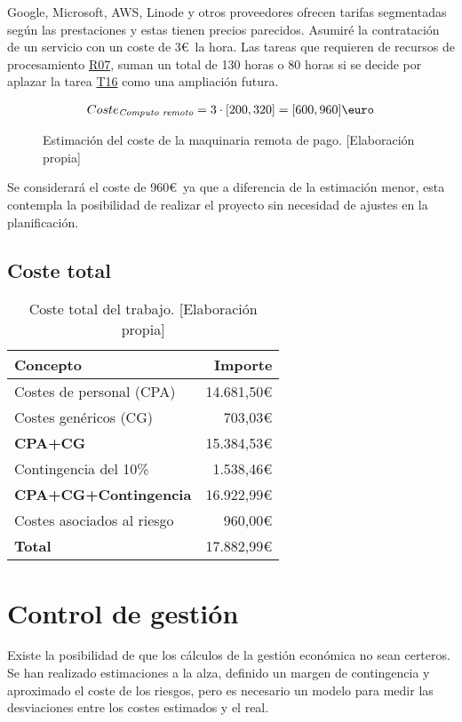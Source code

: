 Google, Microsoft, AWS, Linode y otros proveedores ofrecen tarifas segmentadas según
las prestaciones y estas tienen precios parecidos. Asumiré la contratación de un servicio con un coste de 3\euro\ la hora.
Las tareas que requieren de recursos de procesamiento \hyperref[R07]{R07}, suman un total de
130 horas o 80 horas si se decide por aplazar la tarea \hyperref[T16]{T16} como una ampliación futura.
\begin{figure}[H]
    \begin{align*}
        Coste_{\textit{Computo remoto}} = 3 \cdot [200, 320] = [600, 960]\text{\euro}
    \end{align*}
    \caption{Estimación del coste de la maquinaria remota de pago.  [Elaboración propia]}
\end{figure}
Se considerará el coste de 960\euro\ ya que a diferencia de la estimación menor, esta contempla la posibilidad de
realizar el proyecto sin necesidad de ajustes en la planificación.


\begin{table}[H]
    \subsection{Coste total}
    \begin{center}
        \begin{tabular}{ l r }
         Concepto & Importe \\
         \hline
         Costes de personal (CPA) & 14.681,50\euro \\
         Costes genéricos (CG) & 703,03\euro \\
         \textbf{CPA+CG} & 15.384,53\euro \\
         Contingencia del 10\% & 1.538,46\euro \\
         \textbf{CPA+CG+Contingencia} & 16.922,99\euro \\
         Costes asociados al riesgo & 960,00\euro \\ 
         \hline \hline
         \textbf{Total} & 17.882,99\euro
        \end{tabular}
        \caption{Coste total del trabajo. [Elaboración propia]}\label{totalcosttable}
    \end{center}
\end{table}

\section{Control de gestión}\label{controlgestioneco}
Existe la posibilidad de que los cálculos de la gestión económica no sean certeros.
Se han realizado estimaciones a la alza, definido un margen de contingencia y aproximado el coste de los riesgos,
pero es necesario un modelo para medir las desviaciones entre los costes estimados y el real.

